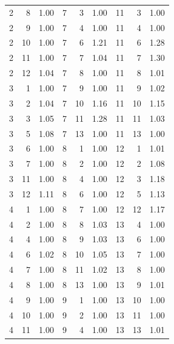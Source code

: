 \begin{table}
\begin{tabular}{|rrl||rrl||rrl|}
       2 &    8 &      1.00 &    7 &    3 &      1.00 &   11 &    3 &      1.00 \\
       2 &    9 &      1.00 &    7 &    4 &      1.00 &   11 &    4 &      1.00 \\
       2 &   10 &      1.00 &    7 &    6 &      1.21 &   11 &    6 &      1.28 \\
       2 &   11 &      1.00 &    7 &    7 &      1.04 &   11 &    7 &      1.30 \\
       2 &   12 &      1.04 &    7 &    8 &      1.00 &   11 &    8 &      1.01 \\
       3 &    1 &      1.00 &    7 &    9 &      1.00 &   11 &    9 &      1.02 \\
       3 &    2 &      1.04 &    7 &   10 &      1.16 &   11 &   10 &      1.15 \\
       3 &    3 &      1.05 &    7 &   11 &      1.28 &   11 &   11 &      1.03 \\
       3 &    5 &      1.08 &    7 &   13 &      1.00 &   11 &   13 &      1.00 \\
       3 &    6 &      1.00 &    8 &    1 &      1.00 &   12 &    1 &      1.01 \\
       3 &    7 &      1.00 &    8 &    2 &      1.00 &   12 &    2 &      1.08 \\
       3 &   11 &      1.00 &    8 &    4 &      1.00 &   12 &    3 &      1.18 \\
       3 &   12 &      1.11 &    8 &    6 &      1.00 &   12 &    5 &      1.13 \\
       4 &    1 &      1.00 &    8 &    7 &      1.00 &   12 &   12 &      1.17 \\
       4 &    2 &      1.00 &    8 &    8 &      1.03 &   13 &    4 &      1.00 \\
       4 &    4 &      1.00 &    8 &    9 &      1.03 &   13 &    6 &      1.00 \\
       4 &    6 &      1.02 &    8 &   10 &      1.05 &   13 &    7 &      1.00 \\
       4 &    7 &      1.00 &    8 &   11 &      1.02 &   13 &    8 &      1.00 \\
       4 &    8 &      1.00 &    8 &   13 &      1.00 &   13 &    9 &      1.01 \\
       4 &    9 &      1.00 &    9 &    1 &      1.00 &   13 &   10 &      1.00 \\
       4 &   10 &      1.00 &    9 &    2 &      1.00 &   13 &   11 &      1.00 \\
       4 &   11 &      1.00 &    9 &    4 &      1.00 &   13 &   13 &      1.01 \\
    \bottomrule
    \end{tabular}
    \label{tab:sens_2_gelman_rubin}
\end{table}

